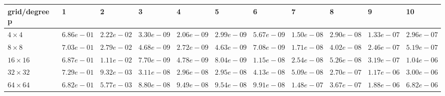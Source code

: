 \begin{tabular}{lllllllllll}
\hline
 grid/degree p   & 1          & 2          & 3          & 4          & 5          & 6          & 7          & 8          & 9          & 10         \\
\hline
 $4 \times 4$    & $6.86e-01$ & $2.22e-02$ & $3.30e-09$ & $2.06e-09$ & $2.99e-09$ & $5.67e-09$ & $1.50e-08$ & $2.90e-08$ & $1.33e-07$ & $2.96e-07$ \\
 $8 \times 8$    & $7.03e-01$ & $2.79e-02$ & $4.68e-09$ & $2.72e-09$ & $4.63e-09$ & $7.08e-09$ & $1.71e-08$ & $4.02e-08$ & $2.46e-07$ & $5.19e-07$ \\
 $16 \times 16$  & $6.87e-01$ & $1.11e-02$ & $7.70e-09$ & $4.78e-09$ & $8.04e-09$ & $1.15e-08$ & $2.54e-08$ & $5.26e-08$ & $3.19e-07$ & $1.04e-06$ \\
 $32 \times 32$  & $7.29e-01$ & $9.32e-03$ & $3.11e-08$ & $2.96e-08$ & $2.95e-08$ & $4.13e-08$ & $5.09e-08$ & $2.70e-07$ & $1.17e-06$ & $3.00e-06$ \\
 $64 \times 64$  & $6.82e-01$ & $5.77e-03$ & $8.80e-08$ & $9.49e-08$ & $9.54e-08$ & $9.91e-08$ & $1.48e-07$ & $3.67e-07$ & $1.88e-06$ & $6.82e-06$ \\
\hline
\end{tabular}
